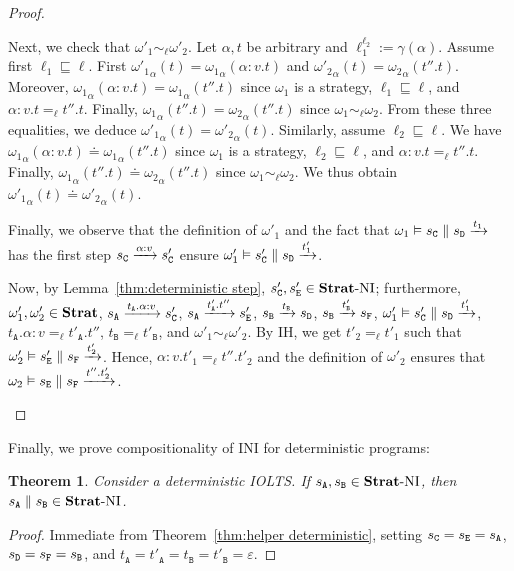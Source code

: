 \documentclass[preprint,5p,twocolumn]{elsarticle}
\newtheorem{theorem}{Theorem}
\begin{document}
\begin{proof}
\begin{itemize}
    Next, we check that $\omega'_1 \sim_\ell \omega'_2$. Let $\alpha,t$ be arbitrary and $\ell_1^{\ell_2} := \gamma(\alpha)$.
    Assume first $\ell_1 \sqsubseteq \ell$. First ${\omega'_1}_\alpha(t)={\omega_1}_\alpha(\alpha:v. t)$ and
    ${\omega'_2}_\alpha(t)={\omega_2}_\alpha(t''.t)$. Moreover,
    ${\omega_1}_\alpha(\alpha:v.t)={\omega_1}_\alpha(t''.t)$ since $\omega_1$ is a strategy, $\ell_1 \sqsubseteq \ell$,
    and $\alpha:v.t =_\ell t''.t$. Finally, ${\omega_1}_\alpha(t''.t) = {\omega_2}_\alpha(t''.t)$ since $\omega_1 \sim_\ell \omega_2$.
    From these three equalities, we deduce ${\omega'_1}_\alpha(t) = {\omega'_2}_\alpha(t)$.
    Similarly, assume $\ell_2 \sqsubseteq \ell$. We have ${\omega_1}_\alpha(\alpha:v.t)\doteq{\omega_1}_\alpha(t''.t)$
    since $\omega_1$ is a strategy, $\ell_2 \sqsubseteq \ell$,
    and $\alpha:v.t =_\ell t''.t$. Finally, ${\omega_1}_\alpha(t''.t) \doteq {\omega_2}_\alpha(t''.t)$ since $\omega_1 \sim_\ell \omega_2$.
    We thus obtain ${\omega'_1}_\alpha(t) \doteq {\omega'_2}_\alpha(t)$.

    Finally, we observe that the definition of $\omega'_1$ and the fact that $\omega_1 \vDash s_{\mathtt{C}} \parallel s_{\mathtt{D}} \xrightarrow{t_1}$
    has the first step $s_{\mathtt{C}} \xrightarrow{\alpha:v} s_{\mathtt{C}}'$  ensure $\omega'_1 \vDash s_{\mathtt{C}}' \parallel s_{\mathtt{D}} \xrightarrow{t'_1}$.

    Now, by Lemma~\ref{thm:deterministic step}, $s_{\mathtt{C}}', s_{\mathtt{E}}' \in \mathbf{Strat}\text{-}\mathrm{NI}$; furthermore,
    $\omega'_1,\omega'_2 \in \mathbf{Strat}$,
    $s_{\mathtt{A}} \xrightarrow{t_{\mathtt{A}}.\alpha:v} s_{\mathtt{C}}'$, $s_{\mathtt{A}} \xrightarrow{t'_{\mathtt{A}}.t''} s_{\mathtt{E}}'$,
    $s_{\mathtt{B}} \xrightarrow{t_{\mathtt{B}}} s_{\mathtt{D}}$, $s_{\mathtt{B}} \xrightarrow{t'_{\mathtt{B}}} s_{\mathtt{F}}$,
    $\omega'_1 \vDash s_{\mathtt{C}}' \parallel s_{\mathtt{D}} \xrightarrow{t'_1}$,
    $t_{\mathtt{A}}.\alpha:v =_\ell t'_{\mathtt{A}}.t''$, $t_{\mathtt{B}} =_\ell t'_{\mathtt{B}}$,
    and $\omega'_1 \sim_\ell \omega'_2$.
    By IH, we get $t'_2 =_\ell t'_1$ such that
    $\omega'_2 \vDash s_{\mathtt{E}}' \parallel s_{\mathtt{F}} \xrightarrow{t'_2}$. Hence, $\alpha:v.t'_1 =_\ell t''.t'_2$
    and the definition of $\omega'_2$ ensures that $\omega_2 \vDash s_{\mathtt{E}} \parallel s_{\mathtt{F}} \xrightarrow{t''.t'_2}$.
  \end{itemize}
\end{proof}

Finally, we prove compositionality of INI for deterministic programs:

\begin{theorem}
  \label{thm:deterministic}
  Consider a deterministic IOLTS. If $s_{\mathtt{A}}, s_{\mathtt{B}} \in \mathbf{Strat}\text{-}\mathrm{NI}$, then $s_{\mathtt{A}} \parallel s_{\mathtt{B}} \in \mathbf{Strat}\text{-}\mathrm{NI}$.
\end{theorem}
\begin{proof}
  Immediate from Theorem~\ref{thm:helper deterministic}, setting $s_{\mathtt{C}} = s_{\mathtt{E}} = s_{\mathtt{A}}$, $s_{\mathtt{D}} = s_{\mathtt{F}} = s_{\mathtt{B}}$,
  and $t_{\mathtt{A}} = t'_{\mathtt{A}} = t_{\mathtt{B}} = t'_{\mathtt{B}} = \varepsilon$.
\end{proof}
\end{document}
